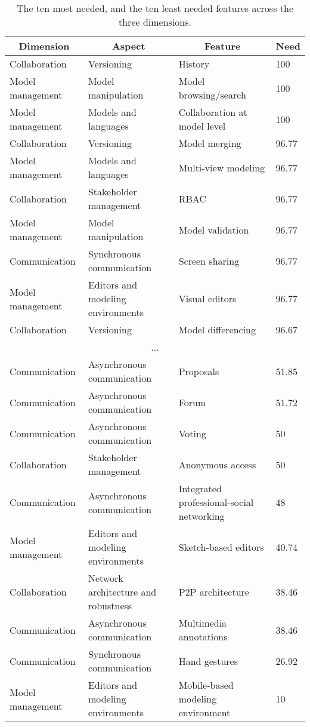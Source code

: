 
  \begin{table*}[]
  \centering
  \notsotiny
  \caption{ The ten most needed, and the ten least needed features across the three dimensions.}
\label{tab:top-bottom-need}
\begin{tabular}{@{}llll@{}}
  \toprule
\multicolumn{1}{c}{\textbf{Dimension}} & \multicolumn{1}{c}{\textbf{Aspect}} & \multicolumn{1}{c}{\textbf{Feature}} & \multicolumn{1}{c}{\textbf{Need}} \\ 

  \midrule
  Collaboration & Versioning & History & 100 \\ 
Model management & Model manipulation & Model browsing/search & 100 \\ 
Model management & Models and languages & Collaboration at model level & 100 \\ 
Collaboration & Versioning & Model merging & 96.77 \\ 
Model management & Models and languages & Multi-view modeling & 96.77 \\ 
Collaboration & Stakeholder management & RBAC & 96.77 \\ 
Model management & Model manipulation & Model validation & 96.77 \\ 
Communication & Synchronous communication & Screen sharing & 96.77 \\ 
Model management & Editors and modeling environments & Visual editors & 96.77 \\ 
Collaboration & Versioning & Model differencing & 96.67 \\ 
\multicolumn{4}{c}{...} \\ 
Communication & Asynchronous communication & Proposals & 51.85 \\ 
Communication & Asynchronous communication & Forum & 51.72 \\ 
Communication & Asynchronous communication & Voting & 50 \\ 
Collaboration & Stakeholder management & Anonymous access & 50 \\ 
Communication & Asynchronous communication & Integrated professional-social networking & 48 \\ 
Model management & Editors and modeling environments & Sketch-based editors & 40.74 \\ 
Collaboration & Network architecture and robustness & P2P architecture & 38.46 \\ 
Communication & Asynchronous communication & Multimedia annotations & 38.46 \\ 
Communication & Synchronous communication & Hand gestures & 26.92 \\ 
Model management & Editors and modeling environments & Mobile-based modeling environment & 10 \\ 
\bottomrule
  \end{tabular}%
  \end{table*}